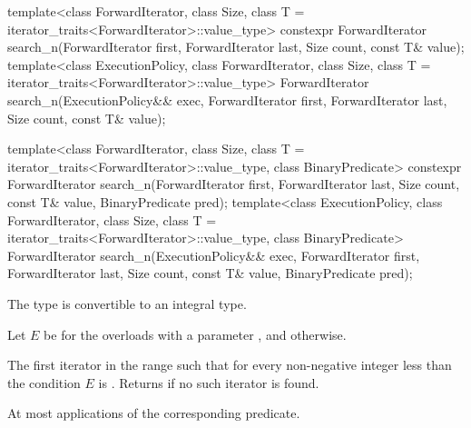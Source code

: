 %
\begin{itemdecl}
template<class ForwardIterator, class Size, class T = iterator_traits<ForwardIterator>::value_type>
  constexpr ForwardIterator
    search_n(ForwardIterator first, ForwardIterator last,
             Size count, const T& value);
template<class ExecutionPolicy, class ForwardIterator, class Size,
         class T = iterator_traits<ForwardIterator>::value_type>
  ForwardIterator
    search_n(ExecutionPolicy&& exec,
             ForwardIterator first, ForwardIterator last,
             Size count, const T& value);

template<class ForwardIterator, class Size, class T = iterator_traits<ForwardIterator>::value_type,
         class BinaryPredicate>
  constexpr ForwardIterator
    search_n(ForwardIterator first, ForwardIterator last,
             Size count, const T& value,
             BinaryPredicate pred);
template<class ExecutionPolicy, class ForwardIterator, class Size,
         class T = iterator_traits<ForwardIterator>::value_type,
         class BinaryPredicate>
  ForwardIterator
    search_n(ExecutionPolicy&& exec,
             ForwardIterator first, ForwardIterator last,
             Size count, const T& value,
             BinaryPredicate pred);
\end{itemdecl}

\begin{itemdescr}

\pnum
\mandates
The type 
is convertible to an integral type.

\pnum
Let $E$ be 
for the overloads with a parameter ,
and  otherwise.

\pnum
\returns
The first iterator  in the range 
such that for every non-negative integer  less than 
the condition $E$ is .
Returns  if no such iterator is found.

\pnum
\complexity
At most  applications of the corresponding predicate.
\end{itemdescr}

